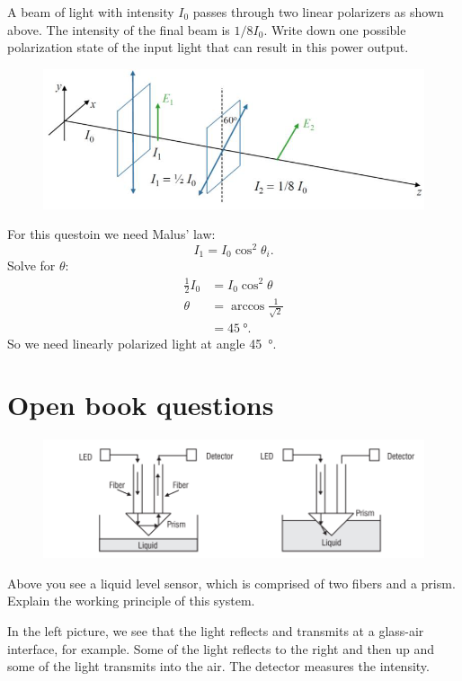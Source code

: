 \documentclass[answers, addpoints]{exam} %
\begin{document}
\begin{questions}
	\question[5] A beam of light with intensity $I_0$ passes through two linear polarizers as shown above. The intensity of the final beam is $1/8 I_0$.
	Write down one possible polarization state of the input light that can result in this power output.
	\begin{figure}[H]
		\centering
		\includegraphics[scale=1]{figures/polarizers}
	\end{figure}		
	\begin{solution}
		For this questoin we need Malus' law:
		\begin{displaymath}
			I_1 = I_0 \cos^2\theta_i.
		\end{displaymath}
		Solve for $\theta$:
		\begin{align*}
			\frac{1}{2}I_0 &= I_0 \cos^2\theta \\
			\theta &= \arccos\frac{1}{\sqrt{2}} \\
			&= \SI{45}{\degree}.
		\end{align*}	
		So we need linearly polarized light at angle \SI{45}{\degree}.
	\end{solution}

\newpage
\part{Open book questions}
\setcounter{question}{0}

\begin{figure}[H]
	\centering
	\includegraphics[scale=1]{figures/liquidsensor}
\end{figure}
\question[10] Above you see a liquid level sensor, which is comprised of two fibers and a prism.
Explain the working principle of this system.
\begin{solution}
	In the left picture, we see that the light reflects and transmits at a glass-air interface, for example.
	Some of the light reflects to the right and then up and some of the light transmits into the air.
	The detector measures the intensity.
	

\end{solution}
\end{questions}
\end{document}
